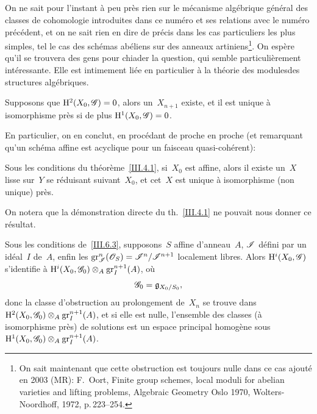 \subsection{}
\label{III.6.6}
On ne sait pour l'instant \`a peu pr\`es rien sur le m\'ecanisme
alg\'ebrique g\'en\'eral des classes de cohomologie introduites
dans ce num\'ero et ses relations avec le num\'ero
pr\'ec\'edent, et on ne sait rien en dire de pr\'ecis dans les
cas particuliers les plus simples, tel le cas des sch\'emas
ab\'eliens sur des anneaux artiniens\footnote{\label{III.6.6.p24}On sait maintenant que cette obstruction est toujours nulle dans ce
cas \lcrochetbf ajout\'e en 2003 (MR): \cf F.\, Oort, Finite group schemes, local moduli for abelian varieties and
lifting problems, Algebraic Geometry Oslo 1970, Wolters-Noordhoff, 1972, p.\,223--254\rcrochetbf.}. On esp\`ere qu'il se trouvera des gens pour chiader la
question, qui semble particuli\`erement int\'eressante. Elle est
intimement li\'ee en particulier \`a la \og th\'eorie des
modules\fg des structures alg\'ebriques.

\begin{corollaire}
\label{III.6.7}
Supposons que $\H^2(X_0,\cal{G})=0$, alors un~$X_{n+1}$ existe, et il
est unique \`a isomorphisme pr\`es si de plus
$\H^1(X_0,\cal{G})=0$.
\end{corollaire}

En particulier, on en conclut, en proc\'edant de proche en proche
(et remarquant qu'un sch\'ema affine est acyclique pour un faisceau
quasi-coh\'erent):

\begin{corollaire}
\label{III.6.8}
Sous
les conditions du th\'eor\`eme~\ref{III.4.1}, si~$X_0$ est
affine, alors il existe un~$X$ lisse sur~$Y$ se r\'eduisant
suivant~$X_0$, et cet~$X$ est unique \`a isomorphisme (non unique)
pr\`es.
\end{corollaire}

On notera que la d\'emonstration directe du th.\, \ref{III.4.1} ne
pouvait nous donner ce r\'esultat.

\begin{corollaire}
\label{III.6.9}
Sous les conditions de~\ref{III.6.3}, supposons~$S$ affine
d'anneau~$A$, $\cal{I}$ d\'efini par un id\'eal~$I$ de~$A$, enfin
les $\gr^n_{\cal{I}}(\cal{O}_S)=\cal{I}^n/\cal{I}^{n+1}$ localement
libres. Alors $\H^i(X_0,\cal{G})$ s'identifie \`a
$\H^i(X_0,\cal{G}_0)\otimes_A\gr^{n+1}_I(A)$, o\`u
$$
\cal{G}_0=\goth{g}_{X_0/S_0},
$$
donc la classe d'obstruction au prolongement de~$X_n$ se trouve dans
$\H^2(X_0,\cal{G}_0)\otimes_A\gr^{n+1}_I(A)$, et si elle est nulle,
l'ensemble des classes (\`a isomorphisme pr\`es) de solutions est
un espace principal homog\`ene sous
$\H^1(X_0,\cal{G}_0)\otimes_A\gr^{n+1}_I(A)$.
\end{corollaire}


